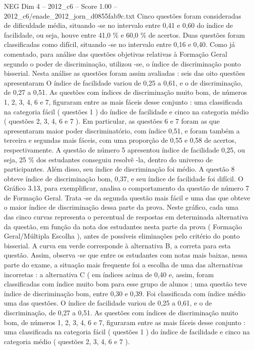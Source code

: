 \begin{textsample}{NEG Dim 4 – 2012\_c6 – Score 1.00 – 2012\_c6/enade\_2012\_jorn\_d0855fab9c.txt}
Cinco questões foram consideradas de dificuldade média, situando -se no intervalo entre 0,41 e 0,60 do índice de facilidade, ou seja, houve entre 41,0 \% e 60,0 \% de acertos.
Duas questões foram classificadas como difícil, situando -se no intervalo entre 0,16 e 0,40.
Como já comentado, para análise das questões objetivas relativas à Formação Geral segundo o poder de discriminação, utilizou -se, o índice de discriminação ponto bisserial.
Nesta análise as questões foram assim avaliadas : seis das oito questões apresentaram O índice de facilidade variou de 0,25 a 0,61, e o de discriminação, de 0,27 a 0,51.
As questões com índices de discriminação muito bom, de números 1, 2, 3, 4, 6 e 7, figuraram entre as mais fáceis desse conjunto : uma classificada na categoria fácil ( questões 1 ) do índice de facilidade e cinco na categoria médio ( questões 2, 3, 4, 6 e 7 ).
Em particular, as questões 6 e 7 foram as que apresentaram maior poder discriminatório, com índice 0,51, e foram também a terceira e segundas mais fáceis, com uma proporção de 0,55 e 0,58 de acertos, respectivamente.
A questão de número 5 apresentou índice de facilidade 0,25, ou seja, 25 \% dos estudantes conseguiu resolvê -la, dentro do universo de participantes.
Além disso, seu índice de discriminação foi médio.
A questão 8 obteve índice de discriminação bom, 0,37, e seu índice de facilidade foi difícil.
O Gráfico 3.13, para exemplificar, analisa o comportamento da questão de número 7 de Formação Geral.
Trata -se da segunda questão mais fácil e uma das que obteve o maior índice de discriminação dessa parte da prova.
Neste gráfico, cada uma das cinco curvas representa o percentual de respostas em determinada alternativa da questão, em função da nota dos estudantes nesta parte da prova ( Formação Geral/Múltipla Escolha ), antes de possíveis eliminações pelo critério do ponto bisserial.
A curva em verde corresponde à alternativa B, a correta para esta questão.
Assim, observa -se que entre os estudantes com notas mais baixas, nessa parte do exame, a situação mais frequente foi a escolha de uma das alternativas incorretas : a alternativa C ( em índices acima de 0,40 e, assim, foram classificadas com índice muito bom para esse grupo de alunos ; uma questão teve índice de discriminação bom, entre 0,30 e 0,39.
Foi classificada com índice médio uma das questões.
O índice de facilidade variou de 0,25 a 0,61, e o de discriminação, de 0,27 a 0,51.
As questões com índices de discriminação muito bom, de números 1, 2, 3, 4, 6 e 7, figuraram entre as mais fáceis desse conjunto : uma classificada na categoria fácil ( questões 1 ) do índice de facilidade e cinco na categoria médio ( questões 2, 3, 4, 6 e 7 ).

\end{textsample}
